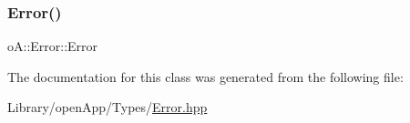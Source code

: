 \mbox{\label{classo_a_1_1_logic_error_adf66492ca8b03fa14d09e5bba7cdacbd}} 
\subsubsection{\texorpdfstring{Error()}{Error()}\hspace{0.1cm}{\footnotesize\ttfamily [2/2]}}
{\footnotesize\ttfamily o\+A\+::\+Error\+::\+Error\hspace{0.3cm}{\ttfamily [inline]}}



The documentation for this class was generated from the following file\+:\begin{DoxyCompactItemize}
\item 
Library/open\+App/\+Types/\mbox{\hyperlink{_error_8hpp}{Error.\+hpp}}\end{DoxyCompactItemize}
